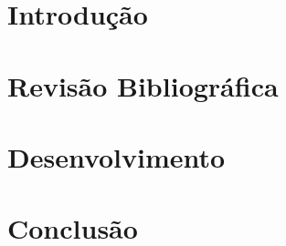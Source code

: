 \documentclass[english]{packages/icmc}
\begin{document}
\textual

\chapter{Introdução}
\label{chapter:introducao}


\chapter{Revisão Bibliográfica}
\label{chapter:bibliografia}


\chapter{Desenvolvimento}
\label{chapter:desenvolvimento}


\chapter{Conclusão}
\label{chapter:conclusao}


% 

\postextual







\glsaddall
\printglossaries

\end{document}
